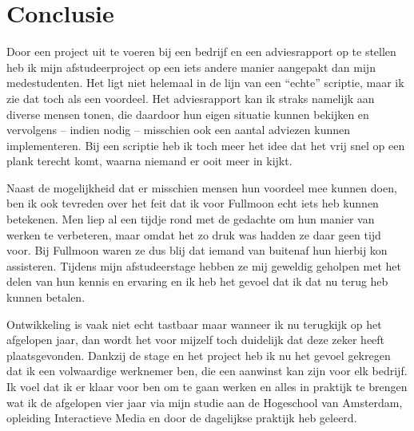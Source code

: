 \chapter{Conclusie}

Door een project uit te voeren bij een bedrijf en een adviesrapport op te stellen heb ik mijn afstudeerproject op een iets andere manier aangepakt dan mijn medestudenten. Het ligt niet helemaal in de lijn van een ``echte'' scriptie, maar ik zie dat toch als een voordeel. Het adviesrapport kan ik straks namelijk aan diverse mensen tonen, die daardoor hun eigen situatie kunnen bekijken en vervolgens -- indien nodig -- misschien ook een aantal adviezen kunnen implementeren. Bij een scriptie heb ik toch meer het idee dat het vrij snel op een plank terecht komt, waarna niemand er ooit meer in kijkt.

Naast de mogelijkheid dat er misschien mensen hun voordeel mee kunnen doen, ben ik ook tevreden over het feit dat ik voor Fullmoon echt iets heb kunnen betekenen. Men liep al een tijdje rond met de gedachte om hun manier van werken te verbeteren, maar omdat het zo druk was hadden ze daar geen tijd voor. Bij Fullmoon waren ze dus blij dat iemand van buitenaf hun hierbij kon assisteren. Tijdens mijn afstudeerstage hebben ze mij geweldig geholpen met het delen van hun kennis en ervaring en ik heb het gevoel dat ik dat nu terug heb kunnen betalen.

Ontwikkeling is vaak niet echt tastbaar maar wanneer ik nu terugkijk op het afgelopen jaar, dan wordt het voor mijzelf toch duidelijk dat deze zeker heeft plaatsgevonden. Dankzij de stage en het project heb ik nu het gevoel gekregen dat ik een volwaardige werknemer ben, die een aanwinst kan zijn voor elk bedrijf. Ik voel dat ik er klaar voor ben om te gaan werken en alles in praktijk te brengen wat ik de afgelopen vier jaar via mijn studie aan de Hogeschool van Amsterdam, opleiding Interactieve Media en door de dagelijkse praktijk heb geleerd.
